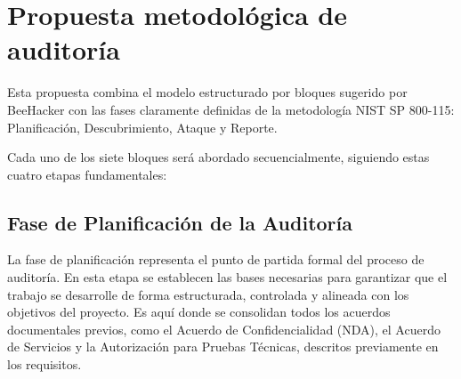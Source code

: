 \documentclass[a4paper, 10pt]{article}
\begin{document}
\clearpage

\section{Propuesta metodológica de auditoría}

Esta propuesta combina el modelo estructurado por bloques sugerido por BeeHacker con las fases claramente definidas de la metodología NIST SP 800-115: Planificación, Descubrimiento, Ataque y Reporte.
\par\vspace{0.5cm}

Cada uno de los siete bloques será abordado secuencialmente, siguiendo estas cuatro etapas fundamentales:


\subsection{Fase de Planificación de la Auditoría}

La fase de planificación representa el punto de partida formal del proceso de auditoría. En esta etapa se establecen las bases necesarias para garantizar que el trabajo se desarrolle de forma estructurada, controlada y alineada con los objetivos del proyecto. Es aquí donde se consolidan todos los acuerdos documentales previos, como el Acuerdo de Confidencialidad (NDA), el Acuerdo de Servicios y la Autorización para Pruebas Técnicas, descritos previamente en los requisitos.
\par\vspace{0.5cm}
\end{document}
